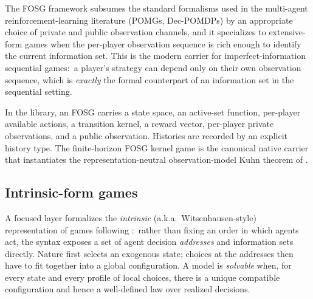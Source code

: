 \noindent
The FOSG framework subsumes the standard formalisms used in the
multi-agent reinforcement-learning literature (POMGs,
Dec-POMDPs) by an appropriate choice of private and public
observation channels, and it specializes to extensive-form games
when the per-player observation sequence is rich enough to identify
the current information set.  This is the modern carrier for
imperfect-information sequential games:\ a player's strategy can
depend only on their own observation sequence, which is
\emph{exactly} the formal counterpart of an information set in the
sequential setting.

In the library, an FOSG carries a state space, an active-set
function, per-player available actions, a transition kernel, a
reward vector, per-player private observations, and a public
observation.  Histories are recorded by an explicit history type.
The finite-horizon FOSG kernel game is the canonical native carrier
that instantiates the representation-neutral observation-model Kuhn
theorem of .


\subsection{Intrinsic-form games}
\label{sec:languages:intrinsic}

A focused layer formalizes the \emph{intrinsic} (a.k.a.\
Witsenhausen-style) representation of games following
\citet{HeymannDeLaraChancelier2020}:\ rather than fixing an order
in which agents act, the syntax exposes a set of agent decision
\emph{addresses} and information sets directly.  Nature first
selects an exogenous state; choices at the addresses then have to
fit together into a global configuration.  A model is
\emph{solvable} when, for every state and every profile of local
choices, there is a unique compatible configuration and hence a
well-defined law over realized decisions.

